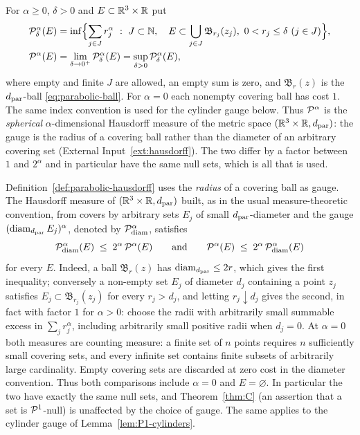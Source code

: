 \documentclass[11pt,reqno]{amsart}
\begin{document}
\begin{definition}\label{def:parabolic-hausdorff}
For $\alpha\ge0$, $\delta>0$ and $E\subset\mathbb{R}^{3}\times\mathbb{R}$ put
\[
\begin{aligned}
  &\mathcal{P}^{\alpha}_{\delta}(E)
  =\inf\Bigl\{\sum_{j\in J}r_{j}^{\alpha}\ :\
     J\subset\mathbb{N},\quad
     E\subset\bigcup_{j\in J}\mathfrak{B}_{r_{j}}(z_{j}),\
     0<r_{j}\le\delta\ (j\in J)\Bigr\},\\
  &\mathcal{P}^{\alpha}(E)=\lim_{\delta\to0^{+}}\mathcal{P}^{\alpha}_{\delta}(E)
  =\sup_{\delta>0}\mathcal{P}^{\alpha}_{\delta}(E),
\end{aligned}
\]
where empty and finite $J$ are allowed, an empty sum is zero, and
$\mathfrak{B}_{r}(z)$ is the $d_{\mathrm{par}}$-ball \eqref{eq:parabolic-ball}.
For $\alpha=0$ each nonempty covering ball has cost $1$.
The same index convention is used for the cylinder gauge below. Thus $\mathcal{P}^{\alpha}$ is the \emph{spherical} $\alpha$-dimensional Hausdorff
measure of the metric space $(\mathbb{R}^{3}\times\mathbb{R},d_{\mathrm{par}})$: the gauge is the radius of
a covering ball rather than the diameter of an arbitrary covering set
(External Input~\ref{ext:hausdorff}). The two differ by a factor between $1$ and
$2^{\alpha}$ and in particular have the same null sets, which is all that is
used.
\end{definition}

\begin{remark}\label{rem:hausdorff-gauge}
Definition~\ref{def:parabolic-hausdorff} uses the \emph{radius} of a covering
ball as gauge. The Hausdorff measure of $(\mathbb{R}^{3}\times\mathbb{R},d_{\mathrm{par}})$ built, as in
the usual measure-theoretic convention, from covers by arbitrary sets $E_{j}$ of
small $d_{\mathrm{par}}$-diameter and the gauge $(\operatorname{diam}_{d_{\mathrm{par}}}E_{j})^{\alpha}$, denoted by
$\mathcal{P}^{\alpha}_{\mathrm{diam}}$, satisfies
\begin{equation}\label{eq:gauge-comparison}
  \mathcal{P}^{\alpha}_{\mathrm{diam}}(E)\;\le\;2^{\alpha}\,\mathcal{P}^{\alpha}(E)
  \qquad\text{and}\qquad
  \mathcal{P}^{\alpha}(E)\;\le\;2^{\alpha}\,\mathcal{P}^{\alpha}_{\mathrm{diam}}(E)
\end{equation}
for every $E$. Indeed, a ball $\mathfrak{B}_{r}(z)$ has
$\operatorname{diam}_{d_{\mathrm{par}}}\le2r$, which gives the first inequality; conversely a non-empty set $E_{j}$
of diameter $d_{j}$ containing a point $z_{j}$ satisfies
$E_{j}\subset\mathfrak{B}_{r_{j}}(z_{j})$ for every $r_{j}>d_{j}$, and letting
$r_{j}\downarrow d_{j}$ gives the second, in fact with factor $1$ for
$\alpha>0$: choose the radii with arbitrarily small summable excess in
$\sum_j r_j^\alpha$, including arbitrarily small positive radii when $d_j=0$. At $\alpha=0$ both
measures are counting measure: a finite set of $n$ points requires $n$
sufficiently small covering sets, and every infinite set contains finite
subsets of arbitrarily large cardinality. Empty covering sets are discarded
at zero cost in the diameter convention. Thus both comparisons include
$\alpha=0$ and $E=\varnothing$. In particular the two have exactly the
same null sets, and Theorem~\ref{thm:C} (an assertion that a set is
$\mathcal{P}^{1}$-null) is unaffected by the choice of gauge. The same applies to
the cylinder gauge of Lemma~\ref{lem:P1-cylinders}.
\end{remark}
\end{document}
